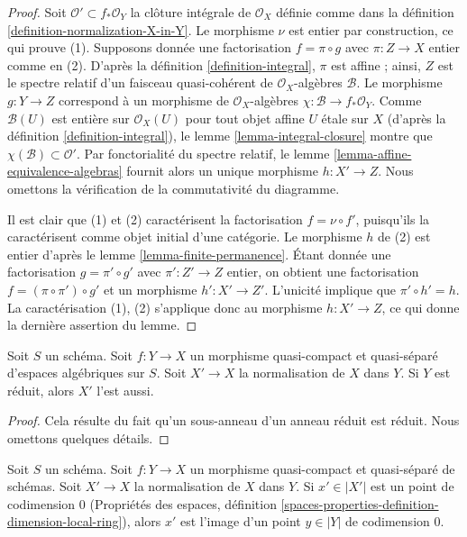 \begin{proof}
Soit $\mathcal{O}' \subset f_*\mathcal{O}_Y$ la clôture intégrale de
$\mathcal{O}_X$ définie comme dans la définition \ref{definition-normalization-X-in-Y}.
Le morphisme $\nu$ est entier par construction, ce qui prouve (1).
Supposons donnée une factorisation $f = \pi \circ g$ avec $\pi : Z \to X$
entier comme en (2). D'après la définition \ref{definition-integral},
$\pi$ est affine ; ainsi, $Z$ est le spectre relatif
d'un faisceau quasi-cohérent de $\mathcal{O}_X$-algèbres $\mathcal{B}$.
Le morphisme $g : Y \to Z$ correspond à un morphisme de $\mathcal{O}_X$-algèbres
$\chi : \mathcal{B} \to f_*\mathcal{O}_Y$. Comme $\mathcal{B}(U)$ est
entière sur $\mathcal{O}_X(U)$ pour tout objet affine $U$ étale sur $X$
(d'après la définition \ref{definition-integral}),
le lemme \ref{lemma-integral-closure} montre
que $\chi(\mathcal{B}) \subset \mathcal{O}'$.
Par fonctorialité du spectre relatif,
le lemme \ref{lemma-affine-equivalence-algebras}
fournit alors un unique morphisme
$h : X' \to Z$. Nous omettons la vérification de la commutativité du diagramme.

\medskip\noindent
Il est clair que (1) et (2) caractérisent la
factorisation $f = \nu \circ f'$, puisqu'ils la caractérisent
comme objet initial d'une catégorie. Le morphisme $h$ de (2)
est entier d'après le lemme \ref{lemma-finite-permanence}.
Étant donnée une factorisation $g = \pi' \circ g'$ avec $\pi' : Z' \to Z$
entier, on obtient une factorisation $f = (\pi \circ \pi') \circ g'$ et
un morphisme $h' : X' \to Z'$. L'unicité implique que
$\pi' \circ h' = h$. La caractérisation (1), (2) s'applique donc
au morphisme $h : X' \to Z$, ce qui donne la dernière assertion du lemme.
\end{proof}

\begin{lemma}
\label{lemma-normalization-in-reduced}
Soit $S$ un schéma. Soit $f : Y \to X$ un morphisme quasi-compact et
quasi-séparé d'espaces algébriques sur $S$.
Soit $X' \to X$ la normalisation de $X$ dans $Y$.
Si $Y$ est réduit, alors $X'$ l'est aussi.
\end{lemma}

\begin{proof}
Cela résulte du fait qu'un sous-anneau d'un anneau réduit est réduit.
Nous omettons quelques détails.
\end{proof}

\begin{lemma}
\label{lemma-normalization-generic}
Soit $S$ un schéma. Soit $f : Y \to X$ un morphisme quasi-compact et quasi-séparé
de schémas. Soit $X' \to X$ la normalisation de $X$ dans $Y$.
Si $x' \in |X'|$ est un point de codimension $0$
(Propriétés des espaces, définition
\ref{spaces-properties-definition-dimension-local-ring}), alors
$x'$ est l'image d'un point $y \in |Y|$ de codimension $0$.
\end{lemma}

